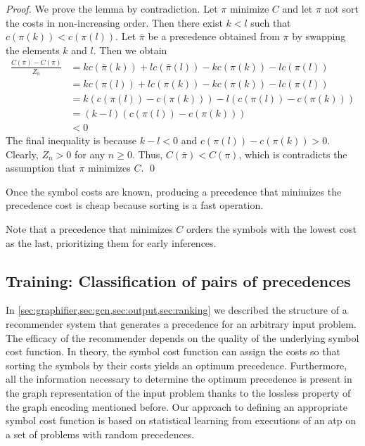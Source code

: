 \begin{proof}
We prove the lemma by contradiction.
Let $\pi$ minimize $C$ and let $\pi$ not sort the costs in non-increasing order.
Then there exist $k < l$ such that $c(\pi(k)) < c(\pi(l))$.
Let $\bar{\pi}$ be a precedence obtained from $\pi$ by swapping the elements $k$ and $l$.
Then we obtain
\begin{align*}
\frac{C(\bar{\pi}) - C(\pi)}{Z_n}
&= kc(\bar{\pi}(k)) + lc(\bar{\pi}(l)) - kc(\pi(k)) - lc(\pi(l)) \\
&= kc(\pi(l)) + lc(\pi(k)) - kc(\pi(k)) - lc(\pi(l)) \\
&= k(c(\pi(l)) - c(\pi(k))) - l(c(\pi(l)) - c(\pi(k))) \\
&= (k-l) (c(\pi(l)) - c(\pi(k))) \\
&< 0
\end{align*}
The final inequality is because $k-l < 0$ and $c(\pi(l)) - c(\pi(k)) > 0$.
Clearly, $Z_n > 0$ for any $n \geq 0$.
Thus, $C(\bar{\pi}) < C(\pi)$, which is contradicts the assumption that $\pi$ minimizes $C$. \qed
\end{proof}

Once the symbol costs are known,
producing a precedence that minimizes the precedence cost is cheap
because sorting is a fast operation.

Note that a precedence that minimizes $C$
orders the symbols with the lowest cost as the last, prioritizing them for early inferences.


\subsection{Training: Classification of pairs of precedences}
\label{sec:training}

In \cref{sec:graphifier,sec:gcn,sec:output,sec:ranking} we described the structure of a recommender system that generates a precedence for an arbitrary input problem.
The efficacy of the recommender depends on the quality of the underlying symbol cost function.
In theory, the symbol cost function can assign the costs so that
sorting the symbols by their costs yields an optimum precedence.
Furthermore, all the information necessary to determine the optimum precedence is present in the graph representation of the input problem
thanks to the lossless property of the graph encoding mentioned before.
Our approach to defining an appropriate symbol cost function is based on statistical learning
from executions of an \gls{atp} on a set of problems with random precedences.

